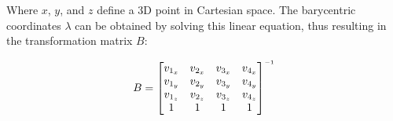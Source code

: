 Where $x$, $y$,  and  $z$  define a 3D point in Cartesian space. The barycentric
coordinates $\lambda$ can be obtained  by  solving  this  linear  equation, thus
resulting in the transformation matrix $B$:

\begin{align}
    \label{eq:bary:cartesian}
    B = \begin{bmatrix}
        v_{1_x} & v_{2_x} & v_{3_x} & v_{4_x} \\
        v_{1_y} & v_{2_y} & v_{3_y} & v_{4_y} \\
        v_{1_z} & v_{2_z} & v_{3_z} & v_{4_z} \\
        1 & 1 & 1 & 1 \\
    \end{bmatrix}\inverse
\end{align}

